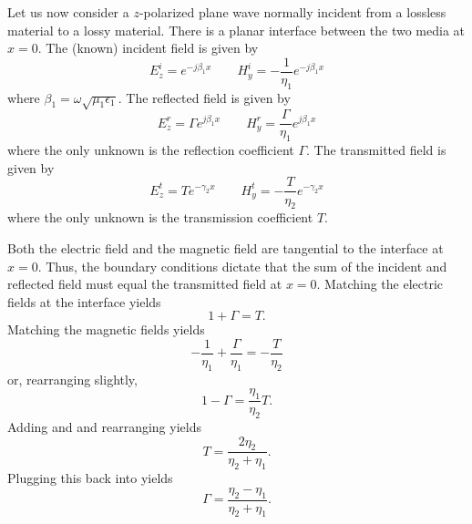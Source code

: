 Let us now consider a $z$-polarized plane wave normally incident from
a lossless material to a lossy material.  There is a planar interface
between the two media at $x=0$.  The (known) incident field
is given by
\begin{equation}
  E_z^i = e^{-j\beta_1x} \qquad H_y^i = -\frac{1}{\eta_1} e^{-j\beta_1x}
\end{equation}
where $\beta_1=\omega\sqrt{\mu_1\epsilon_1}$.  The reflected field is
given by
\begin{equation}
  E_z^r = \Gamma e^{j\beta_1x} \qquad H_y^r = \frac{\Gamma}{\eta_1} e^{j\beta_1x}
\end{equation}
where the only unknown is the reflection coefficient $\Gamma$.  The
transmitted field is given by
\begin{equation}
  E_z^t = T e^{-\gamma_2x} \qquad H_y^t = -\frac{T}{\eta_2}
                                           e^{-\gamma_2 x}
\end{equation}
where the only unknown is the transmission coefficient $T$.

Both the electric field and the magnetic field are tangential to the
interface at $x=0$.  Thus, the boundary conditions dictate that the
sum of the incident and reflected field must equal the transmitted
field at $x=0$.  Matching the electric fields at the interface yields
\begin{equation}
  1+\Gamma = T.  \label{eq:matchingE1D}
\end{equation}
Matching the magnetic fields yields
\begin{equation}
  -\frac{1}{\eta_1} + \frac{\Gamma}{\eta_1} = -\frac{T}{\eta_2}
\end{equation}
or, rearranging slightly,
\begin{equation}
  1 - \Gamma = \frac{\eta_1}{\eta_2}T. \label{eq:matchingH1D}
\end{equation}
Adding  and  and
rearranging yields
\begin{equation}
  T = \frac{2\eta_2}{\eta_2+\eta_1}.
\end{equation}
Plugging this back into  yields
\begin{equation}
  \Gamma = \frac{\eta_2-\eta_1}{\eta_2+\eta_1}.
  \label{eq:pmlGamma1D}
\end{equation}

